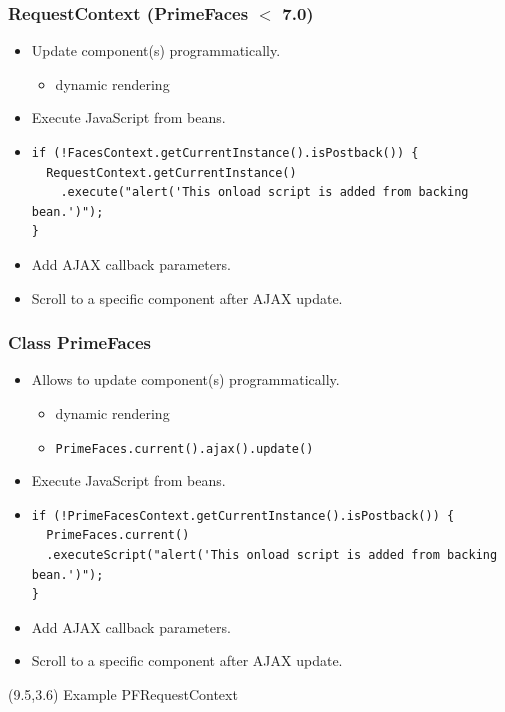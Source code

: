 \documentclass[10pt,xcolor=pdflatex]{beamer}
\begin{document}
\begin{frame}[fragile]\frametitle{RequestContext (PrimeFaces $<$ 7.0)}
  \begin{itemize}
    \item Update component(s) programmatically.
	  \begin{itemize}
		\item dynamic rendering
	  \end{itemize}
    \item Execute JavaScript from beans.
    \item[] \begin{footnotesize}
      \begin{verbatim}
if (!FacesContext.getCurrentInstance().isPostback()) {
  RequestContext.getCurrentInstance()
    .execute("alert('This onload script is added from backing bean.')");
}
\end{verbatim}
    \end{footnotesize}
 	\item Add AJAX callback parameters.
 	\item Scroll to a specific component after AJAX update.
  \end{itemize}
\end{frame}


\begin{frame}[fragile]\frametitle{Class PrimeFaces}
  \begin{itemize}
    \item Allows to update component(s) programmatically.
	  \begin{itemize}
		\item dynamic rendering
		\item \texttt{PrimeFaces.current().ajax().update()}
	  \end{itemize}
    \item Execute JavaScript from beans.
    \item[] \begin{footnotesize}
      \begin{verbatim}
if (!PrimeFacesContext.getCurrentInstance().isPostback()) {
  PrimeFaces.current()
  .executeScript("alert('This onload script is added from backing bean.')");
}
\end{verbatim}
    \end{footnotesize}
 	\item Add AJAX callback parameters.
 	\item Scroll to a specific component after AJAX update.
  \end{itemize}
\begin{textblock}{10}(9.5,3.6)
    {\footnotesize Example PFRequestContext}
\end{textblock}
\end{frame}
\end{document}
